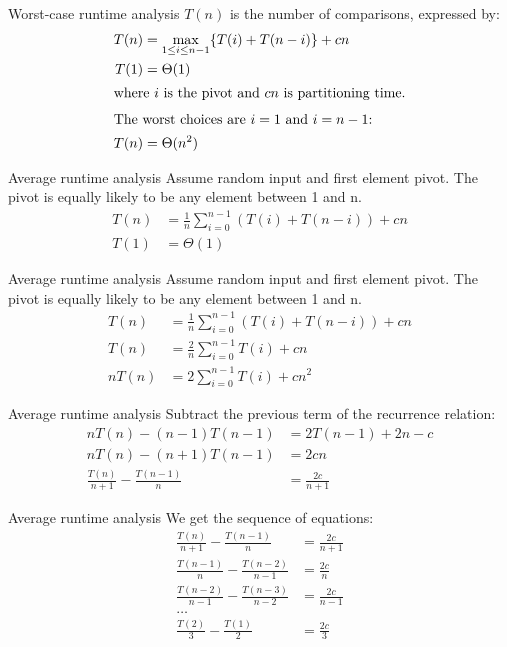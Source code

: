 \documentclass{beamer}
\begin{document}
\begin{frame}{Worst-case runtime analysis}
    $T(n)$ is the number of comparisons, expressed by:
    \begin{align*}
        T(n) &= \max_{1\leq i\leq n-1} \{T(i)+T(n-i)\} + cn \\
        T(1) &= \Theta(1) \\
        \intertext{where $i$ is the pivot and $cn$ is partitioning time.}
        \intertext{The worst choices are $i=1$ and $i=n-1$:}
        T(n) &= \Theta(n^2)
    \end{align*}
\end{frame}
\begin{frame}{Average runtime analysis}
    Assume random input and first element pivot.
    The pivot is equally likely to be any element between 1 and n.
    \begin{align*}
        T(n) &= \frac{1}{n} \sum_{i=0}^{n-1} \left(T(i) + T(n-i)\right) + cn \\
        T(1) &= \Theta(1)
    \end{align*}
\end{frame}
\begin{frame}{Average runtime analysis}
    Assume random input and first element pivot.
    The pivot is equally likely to be any element between 1 and n.
    \begin{align*}
        T(n) &= \frac{1}{n} \sum_{i=0}^{n-1} \left(T(i) + T(n-i)\right) + cn \\
        T(n) &= \frac{2}{n} \sum_{i=0}^{n-1} T(i) + cn \\
        nT(n) &= 2 \sum_{i=0}^{n-1} T(i) + cn^2
    \end{align*}
\end{frame}
\begin{frame}{Average runtime analysis}
    Subtract the previous term of the recurrence relation:
    \begin{align*}
        nT(n) - (n-1)T(n-1) &= 2T(n-1) + 2n - c \\[1em]
        nT(n) - (n+1)T(n-1) &= 2cn \\[1em]
        \frac{T(n)}{n+1} - \frac{T(n-1)}{n} &= \frac{2c}{n+1}
    \end{align*}
\end{frame}
\begin{frame}{Average runtime analysis}
    We get the sequence of equations:
    \begin{align*}
        \frac{T(n)}{n+1} - \frac{T(n-1)}{n} &= \frac{2c}{n+1} \\
        \frac{T(n-1)}{n} - \frac{T(n-2)}{n-1} &= \frac{2c}{n} \\
        \frac{T(n-2)}{n-1} - \frac{T(n-3)}{n-2} &= \frac{2c}{n-1} \\
        \dots& \\
        \frac{T(2)}{3} - \frac{T(1)}{2} &= \frac{2c}{3}
    \end{align*}
\end{frame}
\end{document}
